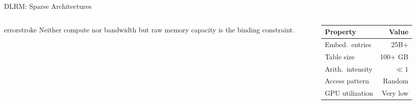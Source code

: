 \documentclass[aspectratio=169, 12pt]{beamer}
\begin{document}
\begin{frame}{DLRM: Sparse Architectures}
\begin{columns}[T]
\begin{column}{0.55\textwidth}
    \vspace{0.1cm}
    \begin{mlsyscard}{errorstroke}
    Neither compute nor bandwidth but \alert{raw memory capacity} is the binding constraint.
    \end{mlsyscard}
  \end{column}
  \begin{column}{0.42\textwidth}
    \renewcommand{\arraystretch}{1.1}
    {\scriptsize
    \begin{tabular}{@{}lr@{}}
      \toprule
      \textbf{Property} & \textbf{Value} \\
      \midrule
      Embed.\ entries & 25B+ \\
      Table size & 100+ GB \\
      Arith.\ intensity & $\ll 1$ \\
      Access pattern & Random \\
      GPU utilization & Very low \\
      \bottomrule
    \end{tabular}
    }
  \end{column}
\end{columns}

\end{frame}
\end{document}
